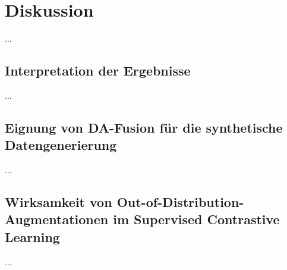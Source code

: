 \chapter{Diskussion}

...

\section{Interpretation der Ergebnisse}

...

\section{Eignung von DA-Fusion für die synthetische Datengenerierung}

...

\section{Wirksamkeit von Out-of-Distribution-Augmentationen im Supervised Contrastive Learning}

...